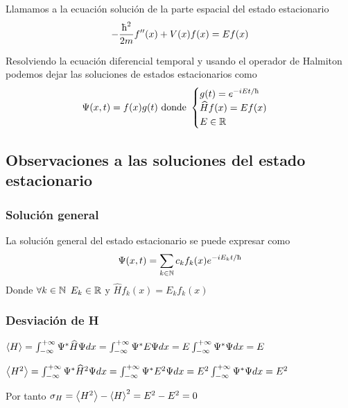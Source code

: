 \begin{definition}
    Llamamos  a la ecuación solución de la parte espacial del estado estacionario
    \begin{equation}
        \label{eq:ecuacion_schrodinger_tempoespacial}
        -\frac{\planckbarsymbol^2}{2m}f''(x)+V(x)f(x)= Ef(x)
    \end{equation}
\end{definition}

Resolviendo la ecuación diferencial temporal y usando el operador de Halmiton podemos dejar las soluciones de estados estacionarios como
\begin{equation}
    \label{eq:solucion_estado_estacionario}
    \fuconda(x,t)=f(x)g(t)\text{ donde }
    \begin{cases}
        g(t)=e^{-iEt/\planckbarsymbol}\\
        \widehat{H}f(x)=Ef(x)\\
        E\in\R
    \end{cases}
\end{equation}

\subsection{Observaciones a las soluciones del estado estacionario}\label{subsec:observaciones-a-las-soluciones-del-estado-estacionario}

\subsubsection{Solución general}
La solución general del estado estacionario se puede expresar como
\begin{equation}
    \label{eq:solucion_general_estado_estacionario}
    \fuconda(x,t)=\sum_{k\in\N}c_k f_k(x)e^{-iE_k t/\planckbarsymbol}
\end{equation}
Donde $\forall k\in\mathbb{N}$ $E_k\in\mathbb{R}$ y $\widehat{H}f_k(x)=E_k f_k(x)$

\subsubsection{Desviación de H}
$\left\langle H\right\rangle = \int_{-\infty}^{+\infty}\Psi^* \widehat{H}\Psi dx = \int_{-\infty}^{+\infty}\Psi^* E\Psi dx=E\int_{-\infty}^{+\infty}\Psi^* \Psi dx = E$

$\left\langle H^2\right\rangle = \int_{-\infty}^{+\infty}\Psi^* \widehat{H}^2\Psi dx = \int_{-\infty}^{+\infty}\Psi^* E^2\Psi dx=E^2\int_{-\infty}^{+\infty}\Psi^* \Psi dx = E^2$

Por tanto $\sigma_H=\left\langle H^2\right\rangle-\left\langle H\right\rangle^2=E^2-E^2=0$
